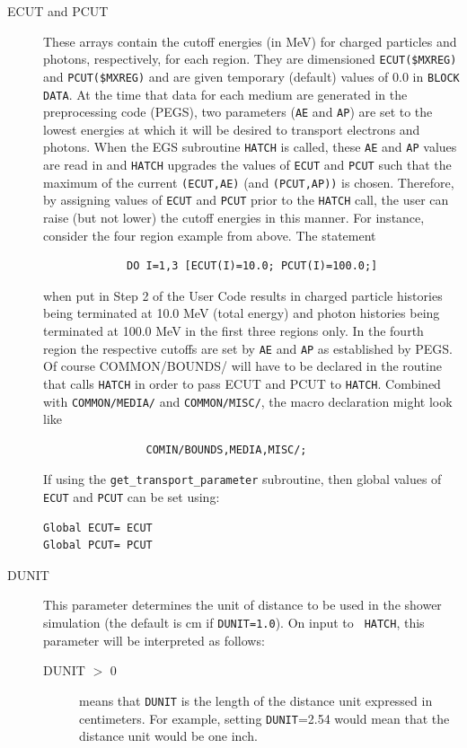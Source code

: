 \begin{description}
\item[ECUT and PCUT] These arrays contain the cutoff energies (in MeV) for
charged particles and photons, respectively, for each region.  They are
dimensioned {\tt ECUT(\$MXREG)} and {\tt PCUT(\$MXREG)} and are given
temporary (default) values of 0.0 in {\tt BLOCK DATA}.  At the time that
data for each medium are generated in the preprocessing code (PEGS), two
parameters ({\tt AE} and {\tt AP}) are set to the lowest energies at which
it will be desired to transport electrons and photons.  When the EGS
subroutine {\tt HATCH} is called, these {\tt AE} and {\tt AP} values are
read in and {\tt HATCH} upgrades the values of {\tt ECUT} and {\tt PCUT}
such that the maximum of the current {\tt (ECUT,AE)} (and {\tt (PCUT,AP))}
is chosen.  Therefore, by assigning values of {\tt ECUT} and {\tt PCUT}
prior to the {\tt HATCH} call, the user can raise (but not lower) the
cutoff energies in this manner.  For instance, consider the four region
example from above.  The statement
\begin{verbatim}
             DO I=1,3 [ECUT(I)=10.0; PCUT(I)=100.0;]
\end{verbatim}
when put in Step 2 of the User Code results in charged particle histories
being terminated at 10.0 MeV (total energy) and photon histories being
terminated at 100.0 MeV in the first three regions only.  In the fourth
region the respective cutoffs are set by {\tt AE} and {\tt AP} as established by PEGS.
Of course COMMON/BOUNDS/ will have to be declared in the routine that calls
{\tt HATCH} in order to pass ECUT and PCUT to {\tt HATCH}.  Combined with
{\tt COMMON/MEDIA/}
and {\tt COMMON/MISC/}, the macro declaration might look like
\begin{verbatim}
                COMIN/BOUNDS,MEDIA,MISC/;
\end{verbatim}

If using the {\tt get\_transport\_parameter} subroutine, then global
values of {\tt ECUT} and {\tt PCUT} can be set using:
\begin{verbatim}
Global ECUT= ECUT
Global PCUT= PCUT
\end{verbatim}

\item[DUNIT] This parameter determines the unit of distance to be used in
the shower simulation (the default is cm if {\tt DUNIT=1.0}).  On input to {\tt
HATCH},
this parameter will be interpreted as follows:
\begin{description}
\item[DUNIT $>$ 0] means that {\tt DUNIT} is the length of the distance unit
expressed in centimeters.  For example, setting {\tt DUNIT}=2.54 would mean that
the distance unit would be one inch.


\end{description}
\end{description}
